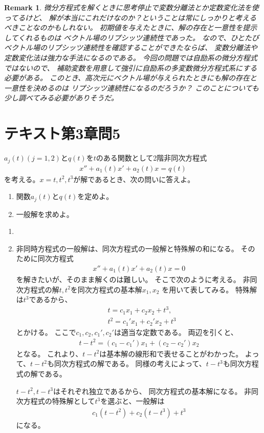 \documentclass{jsarticle}
\newtheorem{remark}{Remark}
\begin{document}
\begin{remark}
微分方程式を解くときに思考停止で変数分離法とか定数変化法を使ってるけど、
解が本当にこれだけなのか？ということは常にしっかりと考えるべきことなのかもしれない。
初期値を与えたときに、解の存在と一意性を提示してくれるものは
ベクトル場のリプシッツ連続性であった。
なので、ひとたびベクトル場のリプシッツ連続性を確認することができたならば、
変数分離法や定数変化法は強力な手法になるのである。
今回の問題では自励系の微分方程式ではないので、
補助変数を用意して強引に自励系の多変数微分方程式系にする必要がある。
このとき、高次元にベクトル場が与えられたときにも解の存在と一意性を決めるのは
リプシッツ連続性になるのだろうか？
このことについても少し調べてみる必要がありそうだ。
\end{remark}

\section{テキスト第3章問5}
\begin{screen}
$a_{j}(t)(j=1,2)$と$q(t)$を$t$のある関数として2階非同次方程式
\begin{eqnarray}
x''+a_{1}(t)x'+a_{2}(t)x=q(t)
\end{eqnarray}
を考える。$x=t,t^{2},t^{3}$が解であるとき、次の問いに答えよ。
\begin{enumerate}
\item 関数$a_{j}(t)$と$q(t)$を定めよ。
\item 一般解を求めよ。
\end{enumerate}
\end{screen}
\begin{enumerate}
\item 
\item 非同時方程式の一般解は、同次方程式の一般解と特殊解の和になる。
そのために同次方程式
\begin{eqnarray}
x''+a_{1}(t)x'+a_{2}(t)x=0
\end{eqnarray}
を解きたいが、そのまま解くのは難しい。
そこで次のように考える。
非同次方程式の解$t,t^{2}$を同次方程式の基本解$x_{1},x_{2}$
を用いて表してみる。
特殊解は$t^{3}$であるから、
\begin{eqnarray}
&t=c_{1}x_{1}+c_{2}x_{2}+t^{3},\\
&t^{2}=c_{1}'x_{1}+c_{2}'x_{2}+t^{3}
\end{eqnarray}
とかける。
ここで$c_{1},c_{2},c_{1}',c_{2}'$は適当な定数である。
両辺を引くと、
\begin{eqnarray}
t-t^{2}=(c_{1}-c_{1}')x_{1}+(c_{2}-c_{2}')x_{2}
\end{eqnarray}
となる。
これより、$t-t^{2}$は基本解の線形和で表せることがわかった。
よって、$t-t^{2}$も同次方程式の解である。
同様の考えによって、$t-t^{3}$も同次方程式の解である。

$t-t^{2},t-t^{3}$はそれぞれ独立であるから、
同次方程式の基本解になる。
非同次方程式の特殊解として$t^{3}$を選ぶと、一般解は
\begin{eqnarray}
c_{1}(t-t^{2})+c_{2}(t-t^{3})+t^{3}
\end{eqnarray}
になる。
\end{enumerate}
\end{document}
